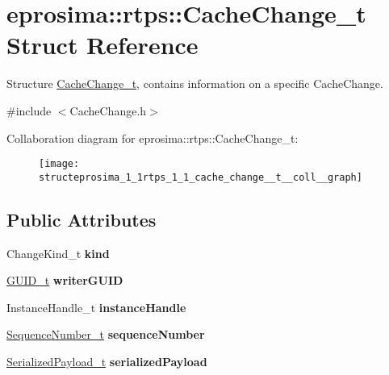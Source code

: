 \hypertarget{structeprosima_1_1rtps_1_1_cache_change__t}{\section{eprosima\-:\-:rtps\-:\-:\-Cache\-Change\-\_\-t \-Struct \-Reference}
\label{structeprosima_1_1rtps_1_1_cache_change__t}
}


\-Structure \hyperlink{structeprosima_1_1rtps_1_1_cache_change__t}{\-Cache\-Change\-\_\-t}, contains information on a specific \-Cache\-Change.  




{\ttfamily \#include $<$\-Cache\-Change.\-h$>$}



\-Collaboration diagram for eprosima\-:\-:rtps\-:\-:\-Cache\-Change\-\_\-t\-:\nopagebreak
\begin{figure}[H]
\begin{center}
\leavevmode
\texttt{[image: structeprosima\_1\_1rtps\_1\_1\_cache\_change\_\_t\_\_coll\_\_graph]}
\end{center}
\end{figure}
\subsection*{\-Public \-Attributes}
\begin{DoxyCompactItemize}
\item 
\hypertarget{structeprosima_1_1rtps_1_1_cache_change__t_a05f797b9de07e81d75d1a61c440a9dd1}{\-Change\-Kind\-\_\-t {\bfseries kind}}\label{structeprosima_1_1rtps_1_1_cache_change__t_a05f797b9de07e81d75d1a61c440a9dd1}

\item 
\hypertarget{structeprosima_1_1rtps_1_1_cache_change__t_acb71597a733f51fb3131baf1ec7fb044}{\hyperlink{structeprosima_1_1rtps_1_1_g_u_i_d__t}{\-G\-U\-I\-D\-\_\-t} {\bfseries writer\-G\-U\-I\-D}}\label{structeprosima_1_1rtps_1_1_cache_change__t_acb71597a733f51fb3131baf1ec7fb044}

\item 
\hypertarget{structeprosima_1_1rtps_1_1_cache_change__t_a83b4db163bc80143a85b801672c15f12}{\-Instance\-Handle\-\_\-t {\bfseries instance\-Handle}}\label{structeprosima_1_1rtps_1_1_cache_change__t_a83b4db163bc80143a85b801672c15f12}

\item 
\hypertarget{structeprosima_1_1rtps_1_1_cache_change__t_a2c59c4131b6e235f49b30821b733b1eb}{\hyperlink{structeprosima_1_1rtps_1_1_sequence_number__t}{\-Sequence\-Number\-\_\-t} {\bfseries sequence\-Number}}\label{structeprosima_1_1rtps_1_1_cache_change__t_a2c59c4131b6e235f49b30821b733b1eb}

\item 
\hypertarget{structeprosima_1_1rtps_1_1_cache_change__t_a0aee80a9723235ebb7edc21529786b3a}{\hyperlink{structeprosima_1_1rtps_1_1_serialized_payload__t}{\-Serialized\-Payload\-\_\-t} {\bfseries serialized\-Payload}}\label{structeprosima_1_1rtps_1_1_cache_change__t_a0aee80a9723235ebb7edc21529786b3a}

\end{DoxyCompactItemize}


